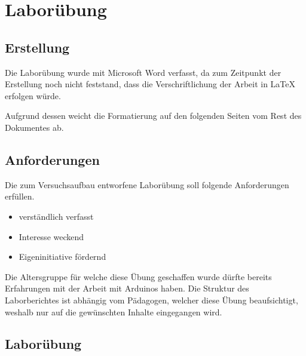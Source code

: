 \chapter{Laborübung}

\section{Erstellung}

Die Laborübung wurde mit Microsoft Word verfasst, da zum Zeitpunkt der Erstellung noch nicht feststand, dass die Verschriftlichung der Arbeit in LaTeX erfolgen würde.

Aufgrund dessen weicht die Formatierung auf den folgenden Seiten vom Rest des Dokumentes ab.

\section{Anforderungen}

Die zum Versuchsaufbau entworfene Laborübung soll folgende Anforderungen erfüllen.

\begin{itemize}
    \item verständlich verfasst
    \item Interesse weckend
    \item Eigeninitiative fördernd
\end{itemize}

Die Altersgruppe für welche diese Übung geschaffen wurde dürfte bereits Erfahrungen mit der Arbeit mit Arduinos haben.
Die Struktur des Laborberichtes ist abhängig vom Pädagogen, welcher diese Übung beaufsichtigt, weshalb nur auf die gewünschten Inhalte eingegangen wird.

\section{Laborübung}

\label{labuebung}
